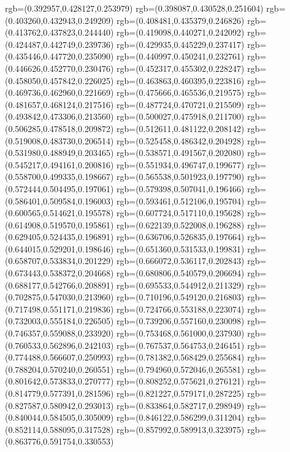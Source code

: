 {{{			rgb=(0.392957,0.428127,0.253979)
			rgb=(0.398087,0.430528,0.251604)
			rgb=(0.403260,0.432943,0.249209)
			rgb=(0.408481,0.435379,0.246826)
			rgb=(0.413762,0.437823,0.244440)
			rgb=(0.419098,0.440271,0.242092)
			rgb=(0.424487,0.442749,0.239736)
			rgb=(0.429935,0.445229,0.237417)
			rgb=(0.435446,0.447720,0.235090)
			rgb=(0.440997,0.450241,0.232761)
			rgb=(0.446626,0.452770,0.230476)
			rgb=(0.452317,0.455302,0.228247)
			rgb=(0.458050,0.457842,0.226025)
			rgb=(0.463863,0.460395,0.223816)
			rgb=(0.469736,0.462960,0.221669)
			rgb=(0.475666,0.465536,0.219575)
			rgb=(0.481657,0.468124,0.217516)
			rgb=(0.487724,0.470721,0.215509)
			rgb=(0.493842,0.473306,0.213560)
			rgb=(0.500027,0.475918,0.211700)
			rgb=(0.506285,0.478518,0.209872)
			rgb=(0.512611,0.481122,0.208142)
			rgb=(0.519008,0.483730,0.206514)
			rgb=(0.525458,0.486342,0.204928)
			rgb=(0.531980,0.488949,0.203465)
			rgb=(0.538571,0.491567,0.202080)
			rgb=(0.545217,0.494161,0.200816)
			rgb=(0.551934,0.496747,0.199677)
			rgb=(0.558700,0.499335,0.198667)
			rgb=(0.565538,0.501923,0.197790)
			rgb=(0.572444,0.504495,0.197061)
			rgb=(0.579398,0.507041,0.196466)
			rgb=(0.586401,0.509584,0.196003)
			rgb=(0.593461,0.512106,0.195704)
			rgb=(0.600565,0.514621,0.195578)
			rgb=(0.607724,0.517110,0.195628)
			rgb=(0.614908,0.519570,0.195861)
			rgb=(0.622139,0.522008,0.196288)
			rgb=(0.629405,0.524435,0.196891)
			rgb=(0.636706,0.526835,0.197664)
			rgb=(0.644015,0.529201,0.198646)
			rgb=(0.651360,0.531533,0.199831)
			rgb=(0.658707,0.533834,0.201229)
			rgb=(0.666072,0.536117,0.202843)
			rgb=(0.673443,0.538372,0.204668)
			rgb=(0.680806,0.540579,0.206694)
			rgb=(0.688177,0.542766,0.208891)
			rgb=(0.695533,0.544912,0.211329)
			rgb=(0.702875,0.547030,0.213960)
			rgb=(0.710196,0.549120,0.216803)
			rgb=(0.717498,0.551171,0.219836)
			rgb=(0.724766,0.553188,0.223074)
			rgb=(0.732003,0.555184,0.226505)
			rgb=(0.739206,0.557160,0.230098)
			rgb=(0.746357,0.559088,0.233920)
			rgb=(0.753468,0.561000,0.237930)
			rgb=(0.760533,0.562896,0.242103)
			rgb=(0.767537,0.564753,0.246451)
			rgb=(0.774488,0.566607,0.250993)
			rgb=(0.781382,0.568429,0.255684)
			rgb=(0.788204,0.570240,0.260551)
			rgb=(0.794960,0.572046,0.265581)
			rgb=(0.801642,0.573833,0.270777)
			rgb=(0.808252,0.575621,0.276121)
			rgb=(0.814779,0.577391,0.281596)
			rgb=(0.821227,0.579171,0.287225)
			rgb=(0.827587,0.580942,0.293013)
			rgb=(0.833864,0.582717,0.298949)
			rgb=(0.840044,0.584505,0.305009)
			rgb=(0.846122,0.586299,0.311204)
			rgb=(0.852114,0.588095,0.317528)
			rgb=(0.857992,0.589913,0.323975)
			rgb=(0.863776,0.591754,0.330553)
}}}
